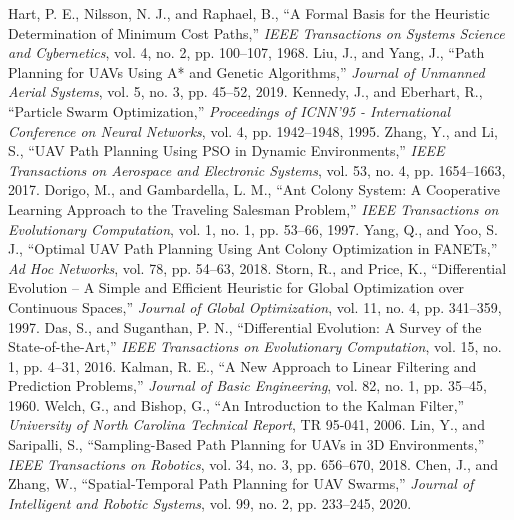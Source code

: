 \documentclass{article}
\begin{document}
\begin{thebibliography}{10}
 Hart, P. E., Nilsson, N. J., and Raphael, B., ``A Formal Basis for the Heuristic Determination of Minimum Cost Paths,'' \textit{IEEE Transactions on Systems Science and Cybernetics}, vol. 4, no. 2, pp. 100--107, 1968.
 Liu, J., and Yang, J., ``Path Planning for UAVs Using A* and Genetic Algorithms,'' \textit{Journal of Unmanned Aerial Systems}, vol. 5, no. 3, pp. 45--52, 2019.
 Kennedy, J., and Eberhart, R., ``Particle Swarm Optimization,'' \textit{Proceedings of ICNN'95 - International Conference on Neural Networks}, vol. 4, pp. 1942--1948, 1995.
 Zhang, Y., and Li, S., ``UAV Path Planning Using PSO in Dynamic Environments,'' \textit{IEEE Transactions on Aerospace and Electronic Systems}, vol. 53, no. 4, pp. 1654--1663, 2017.
 Dorigo, M., and Gambardella, L. M., ``Ant Colony System: A Cooperative Learning Approach to the Traveling Salesman Problem,'' \textit{IEEE Transactions on Evolutionary Computation}, vol. 1, no. 1, pp. 53--66, 1997.
 Yang, Q., and Yoo, S. J., ``Optimal UAV Path Planning Using Ant Colony Optimization in FANETs,'' \textit{Ad Hoc Networks}, vol. 78, pp. 54--63, 2018.
 Storn, R., and Price, K., ``Differential Evolution – A Simple and Efficient Heuristic for Global Optimization over Continuous Spaces,'' \textit{Journal of Global Optimization}, vol. 11, no. 4, pp. 341--359, 1997.
 Das, S., and Suganthan, P. N., ``Differential Evolution: A Survey of the State-of-the-Art,'' \textit{IEEE Transactions on Evolutionary Computation}, vol. 15, no. 1, pp. 4--31, 2016.
 Kalman, R. E., ``A New Approach to Linear Filtering and Prediction Problems,'' \textit{Journal of Basic Engineering}, vol. 82, no. 1, pp. 35--45, 1960.
 Welch, G., and Bishop, G., ``An Introduction to the Kalman Filter,'' \textit{University of North Carolina Technical Report}, TR 95-041, 2006.
 Lin, Y., and Saripalli, S., ``Sampling-Based Path Planning for UAVs in 3D Environments,'' \textit{IEEE Transactions on Robotics}, vol. 34, no. 3, pp. 656--670, 2018.
 Chen, J., and Zhang, W., ``Spatial-Temporal Path Planning for UAV Swarms,'' \textit{Journal of Intelligent and Robotic Systems}, vol. 99, no. 2, pp. 233--245, 2020.



\end{thebibliography}
\end{document}
